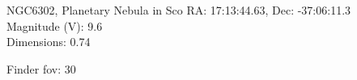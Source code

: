 \begin{block}{NGC6302, Planetary Nebula in Sco}
    RA: 17:13:44.63, Dec: -37:06:11.3 \\ 
    Magnitude (V): 9.6 \\ 
    Dimensions: 0.74 

    Finder fov: 30 
\end{block}